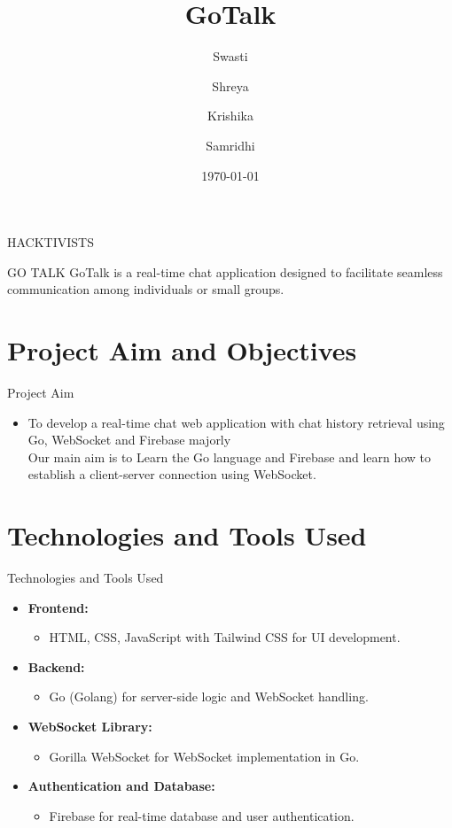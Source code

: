 \documentclass{beamer}
\title{GoTalk}
\author{Swasti \and Shreya \and Krishika \and Samridhi}
\date{\today}
\begin{document}
\begin{frame}
    \titlepage
    \centering HACKTIVISTS
\end{frame}

\begin{frame}{GO TALK}
    GoTalk is a real-time chat application designed to facilitate seamless communication among individuals or small groups.
\end{frame}

\section{Project Aim and Objectives}
\begin{frame}{Project Aim}
    \begin{itemize}
            \item To develop a real-time chat web application with chat history retrieval using Go, WebSocket and Firebase majorly
            \\ Our main aim is to Learn the Go language and Firebase and learn how to establish a client-server connection using WebSocket.
        \end{itemize}
\end{frame}

\section{Technologies and Tools Used}
\begin{frame}{Technologies and Tools Used}
    \begin{itemize}
        \item \textbf{Frontend:}
        \begin{itemize}
            \item HTML, CSS, JavaScript with Tailwind CSS for UI development.
        \end{itemize}
        \item \textbf{Backend:}
        \begin{itemize}
            \item Go (Golang) for server-side logic and WebSocket handling.
        \end{itemize}
        \item \textbf{WebSocket Library:}
        \begin{itemize}
            \item Gorilla WebSocket for WebSocket implementation in Go.
        \end{itemize}
        \item \textbf{Authentication and Database:}
        \begin{itemize}
            \item Firebase for real-time database and user authentication.
        \end{itemize}
        
    \end{itemize}
\end{frame}
\end{document}

